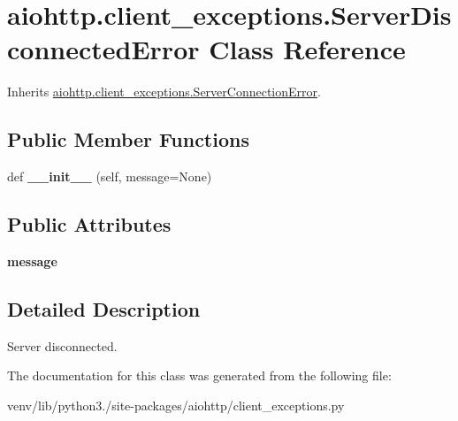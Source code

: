 \hypertarget{classaiohttp_1_1client__exceptions_1_1_server_disconnected_error}{}\section{aiohttp.\+client\+\_\+exceptions.\+Server\+Disconnected\+Error Class Reference}
\label{classaiohttp_1_1client__exceptions_1_1_server_disconnected_error}


Inherits \hyperlink{classaiohttp_1_1client__exceptions_1_1_server_connection_error}{aiohttp.\+client\+\_\+exceptions.\+Server\+Connection\+Error}.

\subsection*{Public Member Functions}
\begin{DoxyCompactItemize}
\item 
\mbox{\label{classaiohttp_1_1client__exceptions_1_1_server_disconnected_error_a6cf6e63cec2bc11a32cd9b88e5872184}} 
def {\bfseries \+\_\+\+\_\+init\+\_\+\+\_\+} (self, message=None)
\end{DoxyCompactItemize}
\subsection*{Public Attributes}
\begin{DoxyCompactItemize}
\item 
\mbox{\label{classaiohttp_1_1client__exceptions_1_1_server_disconnected_error_a43440b6dd0468deff4b49e8afb7f9eea}} 
{\bfseries message}
\end{DoxyCompactItemize}


\subsection{Detailed Description}
\begin{DoxyVerb}Server disconnected.\end{DoxyVerb}
 

The documentation for this class was generated from the following file\+:\begin{DoxyCompactItemize}
\item 
venv/lib/python3./site-\/packages/aiohttp/client\+\_\+exceptions.\+py\end{DoxyCompactItemize}
